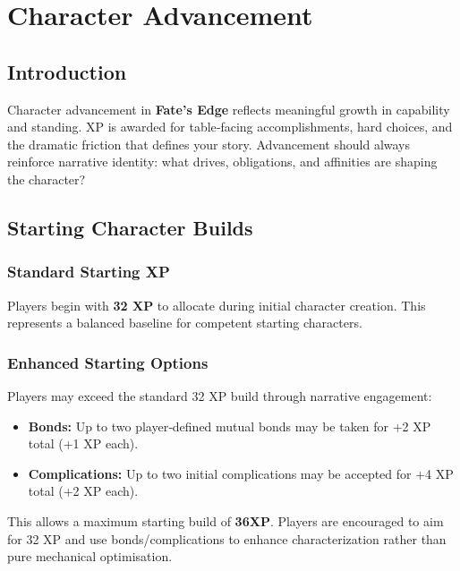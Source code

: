 
\chapter{Character Advancement}\label{chap:character_advancement}

\section{Introduction}\label{sec:advancement_intro}

Character advancement in \textbf{Fate's Edge} reflects meaningful growth in capability and standing. XP is awarded for table‑facing accomplishments, hard choices, and the dramatic friction that defines your story. Advancement should always reinforce narrative identity: what drives, obligations, and affinities are shaping the character?

\section{Starting Character Builds}\label{sec:starting_builds}

\subsection{Standard Starting XP}\label{subsec:standard_starting}

Players begin with \textbf{32 XP} to allocate during initial character creation. This represents a balanced baseline for competent starting characters.

\subsection{Enhanced Starting Options}\label{subsec:enhanced_starting}

Players may exceed the standard 32 XP build through narrative engagement:
\begin{itemize}
    \item \textbf{Bonds:} Up to two player‑defined mutual bonds may be taken for +2 XP total (+1 XP each).
    \item \textbf{Complications:} Up to two initial complications may be accepted for +4 XP total (+2 XP each).
\end{itemize}
This allows a maximum starting build of \textbf{36XP}. Players are encouraged to aim for 32 XP and use bonds/complications to enhance characterization rather than pure mechanical optimisation.


